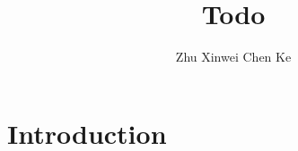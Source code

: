 \documentclass{article}
\title{Todo}
\author{Zhu Xinwei Chen Ke}
\begin{document}
\maketitle

\section{Introduction}

\section{}
\end{document}
